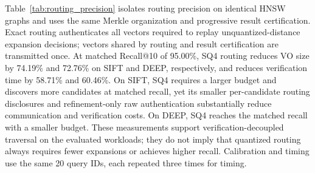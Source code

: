 Table~\ref{tab:routing_precision} isolates routing precision on identical
HNSW graphs and uses the same Merkle organization and progressive result
certification. Exact routing authenticates all vectors required to replay
unquantized-distance expansion decisions; vectors shared by routing and
result certification are transmitted once.
At matched Recall@10 of 95.00\%, SQ4 routing reduces VO size by
74.19\% and 72.76\% on SIFT and DEEP,
respectively, and reduces verification time by
58.71\% and 60.46\%.
On SIFT, SQ4 requires a larger budget and discovers more candidates at matched
recall, yet its smaller per-candidate routing disclosures and refinement-only
raw authentication substantially reduce communication and verification costs.
On DEEP, SQ4 reaches the matched recall with a smaller budget.
These measurements support verification-decoupled traversal on the evaluated
workloads; they do not imply that quantized routing always requires fewer
expansions or achieves higher recall. Calibration and timing use the same
20 query IDs, each repeated three times for timing.
